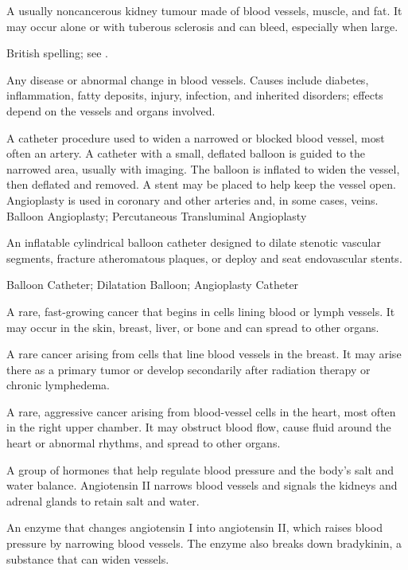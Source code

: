  A usually noncancerous kidney tumour made of blood vessels, muscle, and fat. It may occur alone or with tuberous sclerosis and can bleed, especially when large.

 British spelling; see .

 Any disease or abnormal change in blood vessels. Causes include diabetes, inflammation, fatty deposits, injury, infection, and inherited disorders; effects depend on the vessels and organs involved.

 A catheter procedure used to widen a narrowed or blocked blood vessel, most often an artery. A catheter with a small, deflated balloon is guided to the narrowed area, usually with imaging. The balloon is inflated to widen the vessel, then deflated and removed. A stent may be placed to help keep the vessel open. Angioplasty is used in coronary and other arteries and, in some cases, veins.
\synonyms
Balloon Angioplasty; Percutaneous Transluminal Angioplasty

 An inflatable cylindrical balloon catheter designed to dilate stenotic vascular segments, fracture atheromatous plaques, or deploy and seat endovascular stents.

\synonyms
Balloon Catheter; Dilatation Balloon; Angioplasty Catheter

 A rare, fast-growing cancer that begins in cells lining blood or lymph vessels. It may occur in the skin, breast, liver, or bone and can spread to other organs.

 A rare cancer arising from cells that line blood vessels in the breast. It may arise there as a primary tumor or develop secondarily after radiation therapy or chronic lymphedema.

 A rare, aggressive cancer arising from blood-vessel cells in the heart, most often in the right upper chamber. It may obstruct blood flow, cause fluid around the heart or abnormal rhythms, and spread to other organs.

 A group of hormones that help regulate blood pressure and the body’s salt and water balance. Angiotensin II narrows blood vessels and signals the kidneys and adrenal glands to retain salt and water.

 An enzyme that changes angiotensin I into angiotensin II, which raises blood pressure by narrowing blood vessels. The enzyme also breaks down bradykinin, a substance that can widen vessels.

